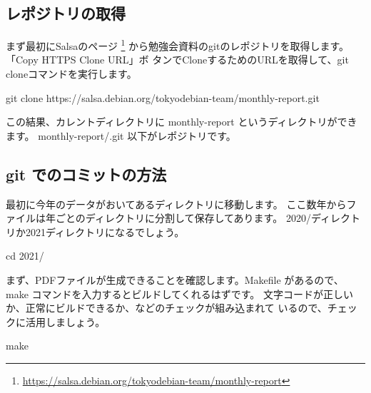 \documentclass[mingoth,a4paper]{jsarticle}
\begin{document}
\subsection{レポジトリの取得}

まず最初にSalsaのページ
\footnote{\url{https://salsa.debian.org/tokyodebian-team/monthly-report}}
から勉強会資料のgitのレポジトリを取得します。「Copy HTTPS Clone URL」ボ
タンでCloneするためのURLを取得して、git cloneコマンドを実行します。

\begin{commandline}
 git clone https://salsa.debian.org/tokyodebian-team/monthly-report.git
\end{commandline}

この結果、カレントディレクトリに monthly-report というディレクトリができ
ます。
monthly-report/.git 以下がレポジトリです。


\subsection{git でのコミットの方法}

最初に今年のデータがおいてあるディレクトリに移動します。
ここ数年からファイルは年ごとのディレクトリに分割して保存してあります。
2020/ディレクトリか2021ディレクトリになるでしょう。

\begin{commandline}
cd 2021/
\end{commandline}

まず、PDFファイルが生成できることを確認します。Makefile があるので、make 
コマンドを入力するとビルドしてくれるはずです。
文字コードが正しいか、正常にビルドできるか、などのチェックが組み込まれて
いるので、チェックに活用しましょう。

\begin{commandline}
 make
\end{commandline}
\end{document}
